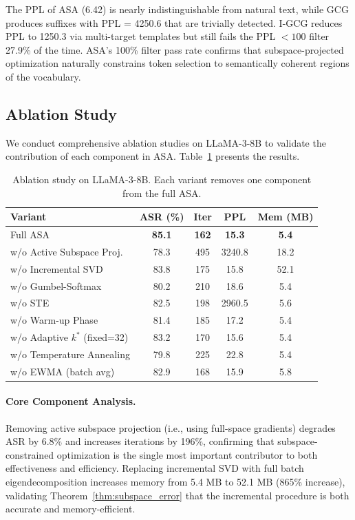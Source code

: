 \documentclass[preprint,12pt]{elsarticle}
\begin{document}
The PPL of ASA (6.42) is nearly indistinguishable from natural text, while GCG produces suffixes with PPL = 4250.6 that are trivially detected. I-GCG reduces PPL to 1250.3 via multi-target templates but still fails the PPL $< 100$ filter 27.9\% of the time. ASA's 100\% filter pass rate confirms that subspace-projected optimization naturally constrains token selection to semantically coherent regions of the vocabulary.

\subsection{Ablation Study}
\label{sec:ablation}

We conduct comprehensive ablation studies on LLaMA-3-8B to validate the contribution of each component in ASA. Table~\ref{tab:ablation} presents the results.

\begin{table}[t]
\centering
\caption{Ablation study on LLaMA-3-8B. Each variant removes one component from the full ASA.}
\label{tab:ablation}
\begin{tabular}{lcccc}
\toprule
\textbf{Variant} & \textbf{ASR (\%)} & \textbf{Iter} & \textbf{PPL} & \textbf{Mem (MB)} \\
\midrule
Full ASA & \textbf{85.1} & \textbf{162} & \textbf{15.3} & \textbf{5.4} \\
w/o Active Subspace Proj. & 78.3 & 495 & 3240.8 & 18.2 \\
w/o Incremental SVD & 83.8 & 175 & 15.8 & 52.1 \\
w/o Gumbel-Softmax & 80.2 & 210 & 18.6 & 5.4 \\
w/o STE & 82.5 & 198 & 2960.5 & 5.6 \\
w/o Warm-up Phase & 81.4 & 185 & 17.2 & 5.4 \\
w/o Adaptive $k^*$ (fixed=32) & 83.2 & 170 & 15.6 & 5.4 \\
w/o Temperature Annealing & 79.8 & 225 & 22.8 & 5.4 \\
w/o EWMA (batch avg) & 82.9 & 168 & 15.9 & 5.8 \\
\bottomrule
\end{tabular}
\end{table}

\paragraph{Core Component Analysis.} Removing active subspace projection (i.e., using full-space gradients) degrades ASR by 6.8\% and increases iterations by 196\%, confirming that subspace-constrained optimization is the single most important contributor to both effectiveness and efficiency. Replacing incremental SVD with full batch eigendecomposition increases memory from 5.4 MB to 52.1 MB (865\% increase), validating Theorem~\ref{thm:subspace_error} that the incremental procedure is both accurate and memory-efficient.
\end{document}
